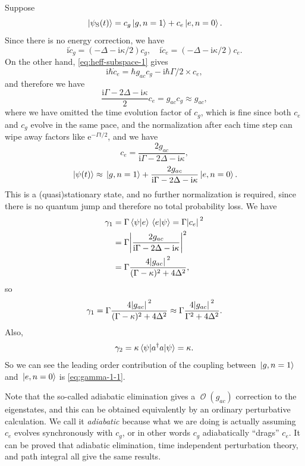 \documentclass[hyperref, a4paper]{article}
\newcommand*{\ii}{\mathrm{i}}
\newcommand*{\ee}{\mathrm{e}}
\DeclareMathOperator{\bigO}{\mathcal{O}}
\begin{document}
\begin{itemize}
Suppose 
\[
    \ket*{\psi_\text{S}(t)} = c_g \ket*{g, n=1} + c_e \ket*{e, n=0}.
\]
Since there is no energy correction, we have 
\[
    \ii \dot{c}_g = (- \Delta - \ii \kappa / 2) c_g, \quad \ii \dot{c}_e = (- \Delta - \ii \kappa / 2) c_e.
\]
On the other hand, \eqref{eq:heff-subspace-1} gives 
\[
    \ii \hbar \dot{c}_e = \hbar g_{ac} c_g - \ii \hbar \Gamma / 2 \times c_e,
\]
and therefore we have 
\[
    \frac{\ii \Gamma - 2 \Delta - \ii \kappa}{2 } c_e = g_{ac} c_g \approx g_{ac},
\]
where we have omitted the time evolution factor of $c_g$, which is fine since both $c_e$ and $c_g$ evolve in 
the same pace, and the normalization after each time step can wipe away factors like $\ee^{- \Gamma t / 2}$,
and we have 
\[
    c_e = \frac{2 g_{ac}}{\ii \Gamma - 2 \Delta - \ii \kappa},
\]
\begin{equation}
    \ket*{\psi(t)} \approx \ket*{g, n=1} + \frac{2 g_{ac}}{\ii \Gamma - 2 \Delta - \ii \kappa} \ket*{e, n=0}.
\end{equation}
This is a (quasi)stationary state, and no further normalization is required, since there is no quantum jump 
and therefore no total probability loss. We have 
\[
    \begin{aligned}
        \gamma_1 &= \Gamma \braket*{\psi}{e} \braket*{e}{\psi} = \Gamma \abs*{c_e}^2 \\
        &= \Gamma \abs{\frac{2 g_{ac}}{\ii \Gamma - 2 \Delta - \ii \kappa}}^2 \\
        &= \Gamma \frac{4 \abs*{g_{ac}}^2}{(\Gamma - \kappa)^2 + 4 \Delta^2 },
    \end{aligned}
\]
so
\begin{equation}
    \gamma_1 = \Gamma \frac{4 \abs*{g_{ac}}^2}{(\Gamma - \kappa)^2 + 4 \Delta^2 } \approx \Gamma \frac{4 \abs*{g_{ac}}^2}{\Gamma^2 + 4 \Delta^2 }.
    \label{eq:gamma-1-1}
\end{equation}
Also, 
\begin{equation}
    \gamma_2 = \kappa \expval{a^\dagger a}{\psi} = \kappa.
\end{equation}
So we can see the leading order contribution of the coupling between $\ket*{g, n=1}$ and $\ket*{e, n=0}$ is 
\eqref{eq:gamma-1-1}.

\begin{note*}{}
    Note that the so-called adiabatic elimination gives a $\bigO(g_{ac})$ correction to the eigenstates,
    and this can be obtained equivalently by an ordinary perturbative calculation. We call it \emph{adiabatic}
    because what we are doing is actually assuming $c_e$ evolves synchronously with $c_g$, or in other words
    $c_{g}$ adiabatically ``drags'' $c_{e}$. 
    It can be proved that adiabatic elimination, time independent perturbation theory, and path integral 
    all give the same results.
\end{note*}


\end{itemize}
\end{document}
